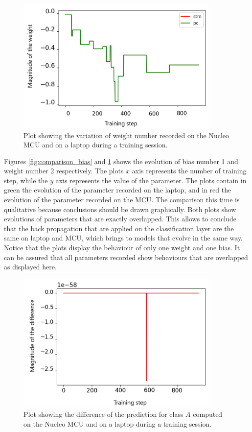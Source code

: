 \documentclass[12pt]{report}
\begin{document}
\begin{figure}[h!]
    \centering
    \includegraphics[width=100mm]{Figures/Chapter5/weight_example.png} 
    \caption{Plot showing the variation of weight number recorded on the Nucleo MCU and on a laptop during a training session.}
    \label{fig:comparison_weights}    
\end{figure}

Figures \ref{fig:comparison_bias} and \ref{fig:comparison_weights} shows the evolution of bias number 1 and weight number 2 respectively. The plots $x$ axis represents the number of training step, while the $y$ axis represents the value of the parameter. The plots contain in green the evolution of the parameter recorded on the laptop, and in red the evolution of the parameter recorded on the MCU. The comparison this time is qualitative because conclusions should be drawn graphically. Both plots show evolutions of parameters that are exactly overlapped. This allows to conclude that the back propagation that are applied on the classification layer are the same on laptop and MCU, which brings to models that evolve in the same way. Notice that the plots display the behaviour of only one weight and one bias. It can be assured that all parameters recorded show behaviours that are overlapped as displayed here.

\begin{figure}[h!]
    \centering
    \includegraphics[width=100mm]{Figures/Chapter5/softmax_example.png} 
    \caption{Plot showing the difference of the prediction for class $A$ computed on the Nucleo MCU and on a laptop during a training session.}
    \label{fig:comparison_softmax}    
\end{figure}
\end{document}
